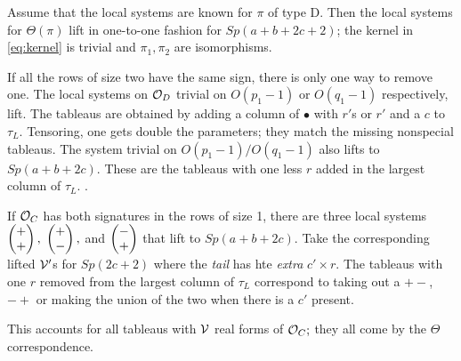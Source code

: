 \documentclass[11pt ,reqno]{amsart}
\begin{document}
\medskip
Assume that the local systems are known for $\pi$ of
type D. Then the local systems for $\Theta(\pi)$ lift in one-to-one
fashion for $Sp(a+b+2c+2)$; the kernel in \eqref{eq:kernel} is trivial
and $\pi_1,\pi_2$ are isomorphisms.

If all the rows of size two have the same sign, there is only one way to
remove one. The local systems on $\mathcal O_D$  trivial on $O(p_1-1)$
or $O(q_1-1)$ respectively,  lift. The tableaus are obtained by adding
a column of $\bullet$ with $r'$s or $r'$ and a $c$ to $\tau_L.$
Tensoring, one gets double the parameters; they match the missing
nonspecial tableaus. The
system trivial on $O(p_1-1)/O(q_1-1)$ also lifts to $Sp(a+b+2c).$
These are the tableaus with one less $r$ added in the largest column
of $\tau_L.$ .

If ${\mathcal O}_C$  has both signatures in the rows of size 1, there are
three local systems $\left(\begin{matrix} +\\+\end{matrix}\right),$ $\left(\begin{matrix}
  +\\-\end{matrix}\right),$ and $\left(\begin{matrix} -\\+\end{matrix}\right)$ that lift to
$Sp(a+b+2c).$ Take the corresponding lifted ${\mathcal V}'$s for $Sp(2c+2)$ where the
\textit{tail} has hte \textit{extra} $c'\times r.$ The tableaus with
one $r$ removed from the largest column of $\tau_L$ correspond to
taking out a $+-$, $-+$ or making the union of the two when there is a
$c'$ present.

This accounts for all tableaus with ${\mathcal V}$  real forms of ${\mathcal O}_C;$ they all come by the $\Theta$ correspondence. 
\end{document}
